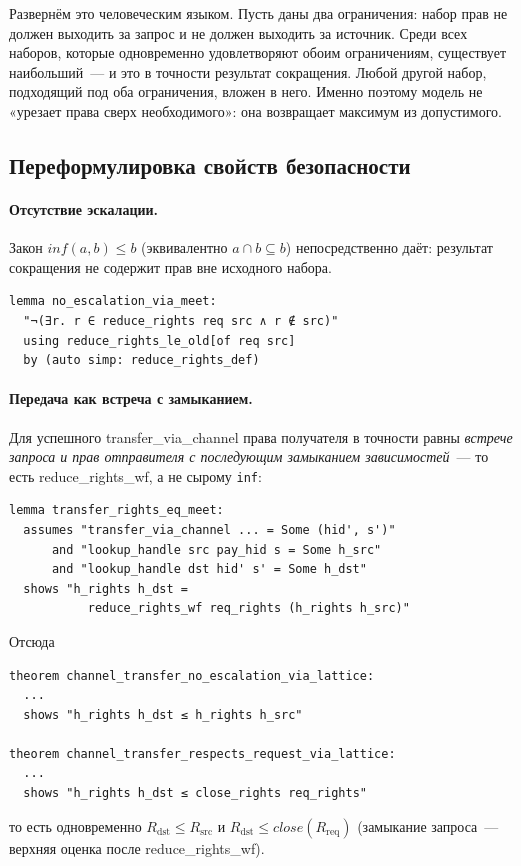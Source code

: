 \documentclass[11pt,a4paper]{article}
\newcommand{\isabel}[1]{{\isabelleit #1}}
\newcommand{\lemmaname}[1]{\isabel{#1}}
\begin{document}
Развернём это человеческим языком. Пусть даны два ограничения: набор
прав не должен выходить за запрос и не должен выходить за источник.
Среди всех наборов, которые одновременно удовлетворяют обоим
ограничениям, существует наибольший~--- и это в точности результат
сокращения. Любой другой набор, подходящий под оба ограничения,
вложен в него. Именно поэтому модель не «урезает права сверх
необходимого»: она возвращает максимум из допустимого.

\subsection{Переформулировка свойств безопасности}

\paragraph{Отсутствие эскалации.}
Закон $\mathit{inf}(a,b)\le b$ (эквивалентно $a\cap b\subseteq b$)
непосредственно даёт: результат сокращения не содержит прав вне исходного
набора.
\begin{lstlisting}
lemma no_escalation_via_meet:
  "¬(∃r. r ∈ reduce_rights req src ∧ r ∉ src)"
  using reduce_rights_le_old[of req src]
  by (auto simp: reduce_rights_def)
\end{lstlisting}

\paragraph{Передача как встреча с замыканием.}
Для успешного \lemmaname{transfer\_via\_channel} права получателя в точности
равны \emph{встрече запроса и прав отправителя с последующим замыканием
	зависимостей}~--- то есть \lemmaname{reduce\_rights\_wf}, а не сырому
\texttt{inf}:
\begin{lstlisting}
lemma transfer_rights_eq_meet:
  assumes "transfer_via_channel ... = Some (hid', s')"
      and "lookup_handle src pay_hid s = Some h_src"
      and "lookup_handle dst hid' s' = Some h_dst"
  shows "h_rights h_dst =
           reduce_rights_wf req_rights (h_rights h_src)"
\end{lstlisting}
Отсюда
\begin{lstlisting}
theorem channel_transfer_no_escalation_via_lattice:
  ...
  shows "h_rights h_dst ≤ h_rights h_src"

theorem channel_transfer_respects_request_via_lattice:
  ...
  shows "h_rights h_dst ≤ close_rights req_rights"
\end{lstlisting}
то есть одновременно $R_{\mathrm{dst}} \le R_{\mathrm{src}}$ и
$R_{\mathrm{dst}} \le \mathit{close}(R_{\mathrm{req}})$ (замыкание
запроса~--- верхняя оценка после \lemmaname{reduce\_rights\_wf}).
\end{document}
